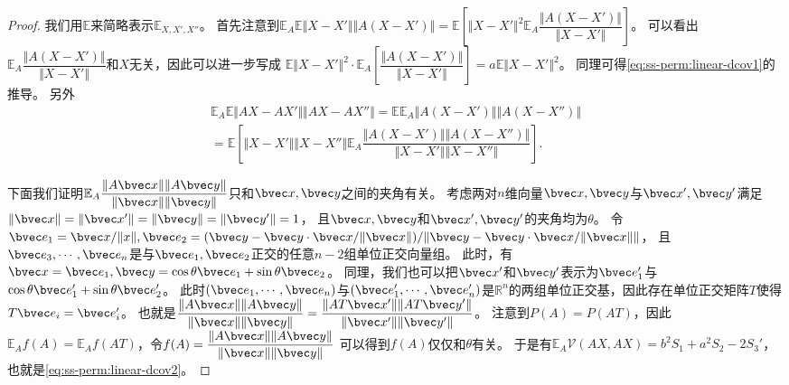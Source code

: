 \begin{proof}
我们用$\mathbb E$来简略表示$\mathbb E_{X,X',X''}$。
%
首先注意到$\mathbb E_A\mathbb E\Vert X - X' \Vert \Vert A(X - X') \Vert = \mathbb E \left[ \Vert X - X'\Vert^2 \mathbb E_A \dfrac{\Vert A(X - X') \Vert }{\Vert X - X'\Vert} \right]$。
%
可以看出$\mathbb E_A \dfrac{\Vert A(X - X') \Vert }{\Vert X - X'\Vert}$和$X$无关，因此可以进一步写成
$\mathbb E \Vert X - X'\Vert^2 \cdot \mathbb E_A \left[ \dfrac{\Vert A(X - X') \Vert }{\Vert X - X'\Vert} \right] = a\mathbb E \Vert X - X'\Vert^2$。
%
同理可得\autoref{eq:ss-perm:linear-dcov1}的推导。
另外
\begin{equation}
\begin{split}
    \mathbb E_A \mathbb E{\Vert AX - AX' \Vert \Vert AX - AX'' \Vert} = 
    \mathbb E \mathbb E_A \Vert A(X - X') \Vert \Vert A(X - X'') \Vert \\
    =
    \mathbb E \left[ \Vert X - X' \Vert \Vert X - X'' \Vert \mathbb E_A \dfrac{\Vert A(X - X') \Vert \Vert A(X - X'') \Vert}{\Vert X - X' \Vert \Vert X - X'' \Vert}  \right].
\end{split}
\end{equation}

下面我们证明$\mathbb E_A \dfrac{\Vert A\bvec x\Vert \Vert A \bvec y\Vert }{\Vert \bvec x \Vert \Vert \bvec y \Vert}$只和$\bvec x, \bvec y$之间的夹角有关。
%
考虑两对$n$维向量$\bvec x, \bvec y$与$\bvec x', \bvec y'$满足$\Vert \bvec x \Vert = \Vert \bvec x' \Vert = \Vert \bvec y \Vert = \Vert \bvec y' \Vert = 1$，
且$\bvec x, \bvec y$和$\bvec x', \bvec y'$的夹角均为$\theta$。
%
令$\bvec e_1 = \bvec x/\Vert x \Vert, \bvec e_2 = (\bvec y - \bvec y \cdot \bvec x/\Vert \bvec x \Vert) / \Vert \bvec y - \bvec y \cdot \bvec x/\Vert \bvec x \Vert \Vert$，
且$\bvec e_3, \cdots, \bvec e_n$是与$\bvec e_1, \bvec e_2$正交的任意$n-2$组单位正交向量组。
%
此时，有$\bvec x = \bvec e_1, \bvec y = \cos \theta \bvec e_1 + \sin \theta \bvec e_2$。
%
同理，我们也可以把$\bvec x'$和$\bvec y'$表示为$\bvec e_1'$与$\cos \theta \bvec e'_1 + \sin \theta \bvec e'_2$。
%
此时$(\bvec e_1, \cdots, \bvec e_n)$与$(\bvec e'_1, \cdots, \bvec e'_n)$是$\mathbb R^n$的两组单位正交基，因此存在单位正交矩阵$T$使得$T\bvec e_i = \bvec e'_i$。
%
也就是$\dfrac{\Vert A\bvec x \Vert\Vert A\bvec y \Vert}{\Vert \bvec x\Vert \Vert \bvec y \Vert} = \dfrac{\Vert AT\bvec x' \Vert\Vert AT\bvec y' \Vert}{\Vert \bvec x'\Vert \Vert \bvec y' \Vert}$。
%
注意到$P(A)=P(AT)$，因此$\mathbb E_A f(A) = \mathbb E_A f(AT)$，令$f(A) = \dfrac{\Vert A\bvec x \Vert\Vert A\bvec y \Vert}{\Vert \bvec x\Vert \Vert \bvec y \Vert}$ 可以得到$f(A)$仅仅和$\theta$有关。
%
于是有$\mathbb E_A \mathcal{V}(AX, AX) = b^2 S_1 + a^2 S_2 - 2S_3'$，也就是\autoref{eq:ss-perm:linear-dcov2}。
\end{proof}

